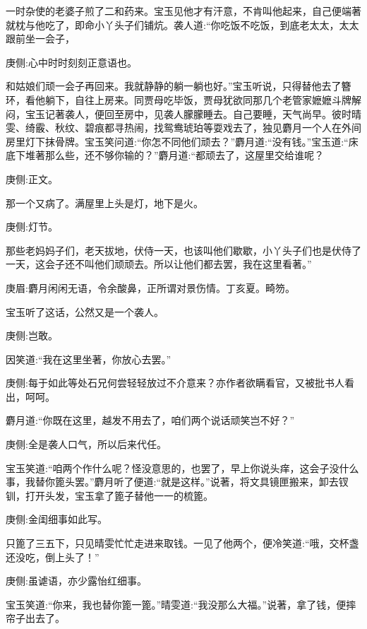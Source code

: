 \begin{parag}
    一时杂使的老婆子煎了二和药来。宝玉见他才有汗意，不肯叫他起来，自己便端著就枕与他吃了，即命小丫头子们铺炕。袭人道:“你吃饭不吃饭，到底老太太，太太跟前坐一会子，\begin{note}庚侧:心中时时刻刻正意语也。\end{note}和姑娘们顽一会子再回来。我就静静的躺一躺也好。”宝玉听说，只得替他去了簪环，看他躺下，自往上房来。同贾母吃毕饭，贾母犹欲同那几个老管家嬷嬷斗牌解闷，宝玉记著袭人，便回至房中，见袭人朦朦睡去。自己要睡，天气尚早。彼时晴雯、绮霰、秋纹、碧痕都寻热闹，找鸳鸯琥珀等耍戏去了，独见麝月一个人在外间房里灯下抹骨牌。宝玉笑问道:“你怎不同他们顽去？”麝月道:“没有钱。”宝玉道:“床底下堆著那么些，还不够你输的？”麝月道:“都顽去了，这屋里交给谁呢？\begin{note}庚侧:正文。\end{note}那一个又病了。满屋里上头是灯，地下是火。\begin{note}庚侧:灯节。\end{note}那些老妈妈子们，老天拔地，伏侍一天，也该叫他们歇歇，小丫头子们也是伏侍了一天，这会子还不叫他们顽顽去。所以让他们都去罢，我在这里看著。”\begin{note}庚眉:麝月闲闲无语，令余酸鼻，正所谓对景伤情。丁亥夏。畸笏。\end{note}
\end{parag}


\begin{parag}
    宝玉听了这话，公然又是一个袭人。\begin{note}庚侧:岂敢。\end{note}因笑道:“我在这里坐著，你放心去罢。”\begin{note}庚侧:每于如此等处石兄何尝轻轻放过不介意来？亦作者欲瞒看官，又被批书人看出，呵呵。\end{note}麝月道:“你既在这里，越发不用去了，咱们两个说话顽笑岂不好？”\begin{note}庚侧:全是袭人口气，所以后来代任。\end{note}宝玉笑道:“咱两个作什么呢？怪没意思的，也罢了，早上你说头痒，这会子没什么事，我替你篦头罢。”麝月听了便道:“就是这样。”说著，将文具镜匣搬来，卸去钗钏，打开头发，宝玉拿了篦子替他一一的梳篦。\begin{note}庚侧:金闺细事如此写。\end{note}只篦了三五下，只见晴雯忙忙走进来取钱。一见了他两个，便冷笑道:“哦，交杯盏还没吃，倒上头了！”\begin{note}庚侧:虽谑语，亦少露怡红细事。\end{note}宝玉笑道:“你来，我也替你篦一篦。”晴雯道:“我没那么大福。”说著，拿了钱，便摔帘子出去了。
\end{parag}


